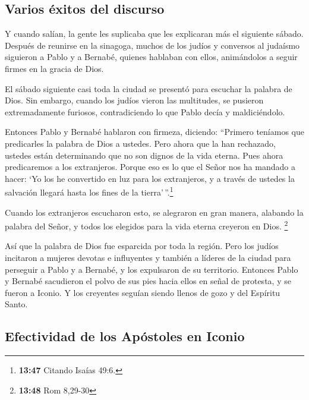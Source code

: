\hypertarget{varios-uxe9xitos-del-discurso}{%
\subsection{Varios éxitos del
discurso}\label{varios-uxe9xitos-del-discurso}}

 Y cuando salían, la gente les suplicaba que les
explicaran más el siguiente sábado.  Después de reunirse
en la sinagoga, muchos de los judíos y conversos al judaísmo siguieron a
Pablo y a Bernabé, quienes hablaban con ellos, animándolos a seguir
firmes en la gracia de Dios.

 El sábado siguiente casi toda la ciudad se presentó para
escuchar la palabra de Dios.  Sin embargo, cuando los
judíos vieron las multitudes, se pusieron extremadamente furiosos,
contradiciendo lo que Pablo decía y maldiciéndolo.

 Entonces Pablo y Bernabé hablaron con firmeza, diciendo:
``Primero teníamos que predicarles la palabra de Dios a ustedes. Pero
ahora que la han rechazado, ustedes están determinando que no son dignos
de la vida eterna. Pues ahora predicaremos a los extranjeros.
 Porque eso es lo que el Señor nos ha mandado a hacer:
`Yo los he convertido en luz para los extranjeros, y a través de ustedes
la salvación llegará hasta los fines de la tierra'\,''.\footnote{\textbf{13:47}
  Citando Isaías 49:6.}

 Cuando los extranjeros escucharon esto, se alegraron en
gran manera, alabando la palabra del Señor, y todos los elegidos para la
vida eterna creyeron en Dios. \footnote{\textbf{13:48} Rom 8,29-30}

 Así que la palabra de Dios fue esparcida por toda la
región.  Pero los judíos incitaron a mujeres devotas e
influyentes y también a líderes de la ciudad para perseguir a Pablo y a
Bernabé, y los expulsaron de su territorio.  Entonces
Pablo y Bernabé sacudieron el polvo de sus pies hacia ellos en señal de
protesta, y se fueron a Iconio.  Y los creyentes seguían
siendo llenos de gozo y del Espíritu Santo.

\hypertarget{efectividad-de-los-apuxf3stoles-en-iconio}{%
\subsection{Efectividad de los Apóstoles en
Iconio}\label{efectividad-de-los-apuxf3stoles-en-iconio}}

